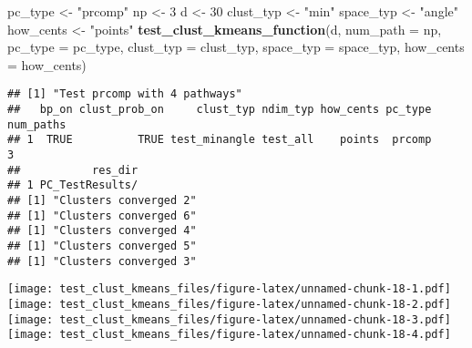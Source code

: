 \documentclass[
]{article}
\newenvironment{Shaded}{\begin{snugshade}}{\end{snugshade}}
\newcommand{\AttributeTok}[1]{\textcolor[rgb]{0.13,0.29,0.53}{#1}}
\newcommand{\DecValTok}[1]{\textcolor[rgb]{0.00,0.00,0.81}{#1}}
\newcommand{\FunctionTok}[1]{\textcolor[rgb]{0.13,0.29,0.53}{\textbf{#1}}}
\newcommand{\NormalTok}[1]{#1}
\newcommand{\OtherTok}[1]{\textcolor[rgb]{0.56,0.35,0.01}{#1}}
\newcommand{\StringTok}[1]{\textcolor[rgb]{0.31,0.60,0.02}{#1}}
\begin{document}
\begin{Shaded}
\begin{Highlighting}[]
\NormalTok{pc\_type }\OtherTok{\textless{}{-}} \StringTok{"prcomp"}
\NormalTok{np }\OtherTok{\textless{}{-}} \DecValTok{3}
\NormalTok{d }\OtherTok{\textless{}{-}} \DecValTok{30}
\NormalTok{clust\_typ }\OtherTok{\textless{}{-}} \StringTok{"min"}
\NormalTok{space\_typ }\OtherTok{\textless{}{-}} \StringTok{"angle"}
\NormalTok{how\_cents }\OtherTok{\textless{}{-}} \StringTok{"points"}
\FunctionTok{test\_clust\_kmeans\_function}\NormalTok{(d,}
                           \AttributeTok{num\_path =}\NormalTok{ np,}
                           \AttributeTok{pc\_type =}\NormalTok{ pc\_type,}
                           \AttributeTok{clust\_typ =}\NormalTok{ clust\_typ,}
                           \AttributeTok{space\_typ =}\NormalTok{ space\_typ,}
                           \AttributeTok{how\_cents =}\NormalTok{ how\_cents)}
\end{Highlighting}
\end{Shaded}

\begin{verbatim}
## [1] "Test prcomp with 4 pathways"
##   bp_on clust_prob_on     clust_typ ndim_typ how_cents pc_type num_paths
## 1  TRUE          TRUE test_minangle test_all    points  prcomp         3
##           res_dir
## 1 PC_TestResults/
## [1] "Clusters converged 2"
## [1] "Clusters converged 6"
## [1] "Clusters converged 4"
## [1] "Clusters converged 5"
## [1] "Clusters converged 3"
\end{verbatim}

\texttt{[image: test\_clust\_kmeans\_files/figure-latex/unnamed-chunk-18-1.pdf]}
\texttt{[image: test\_clust\_kmeans\_files/figure-latex/unnamed-chunk-18-2.pdf]}
\texttt{[image: test\_clust\_kmeans\_files/figure-latex/unnamed-chunk-18-3.pdf]}
\texttt{[image: test\_clust\_kmeans\_files/figure-latex/unnamed-chunk-18-4.pdf]}
\end{document}
